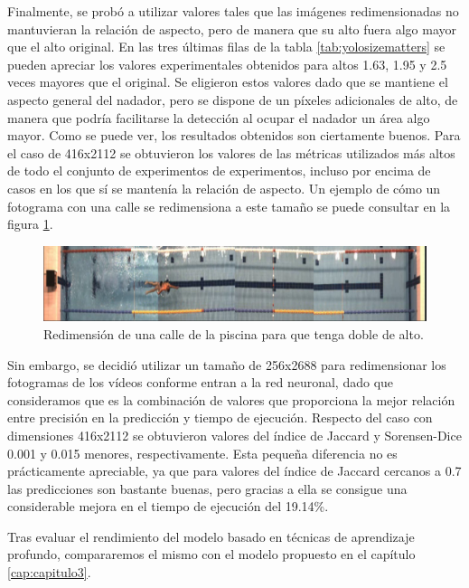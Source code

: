 Finalmente, se probó a utilizar valores tales que las imágenes redimensionadas no mantuvieran la relación de aspecto, pero de manera que su alto fuera algo mayor que el alto original. En las tres últimas filas de la tabla \ref{tab:yolosizematters} se pueden apreciar los valores experimentales obtenidos para altos 1.63, 1.95 y 2.5 veces mayores que el original. Se eligieron estos valores dado que se mantiene el aspecto general del nadador, pero se dispone de un píxeles adicionales de alto, de manera que podría facilitarse la detección al ocupar el nadador un área algo mayor. Como se puede ver, los resultados obtenidos son ciertamente buenos. Para el caso de 416x2112 se obtuvieron los valores de las métricas utilizados más altos de todo el conjunto de experimentos de experimentos, incluso por encima de casos en los que sí se mantenía la relación de aspecto. Un ejemplo de cómo un fotograma con una calle se redimensiona a este tamaño se puede consultar en la figura \ref{fig:ejemplredimensiondoblealto}.

\begin{figure}
    \centering
    \includegraphics[width=\textwidth,height=\textheight,keepaspectratio]{imagenes/parte_IA/416x2112_YOLO_resize.png}
    \caption{Redimensión de una calle de la piscina para que tenga doble de alto.}
    \label{fig:ejemplredimensiondoblealto}
\end{figure}

Sin embargo, se decidió utilizar un tamaño de 256x2688 para redimensionar los fotogramas de los vídeos conforme entran a la red neuronal, dado que consideramos que es la combinación de valores que proporciona la mejor relación entre precisión en la predicción y tiempo de ejecución. Respecto del caso con dimensiones 416x2112 se obtuvieron valores del índice de Jaccard y Sorensen-Dice 0.001 y 0.015 menores, respectivamente. Esta pequeña diferencia no es prácticamente apreciable, ya que para valores del índice de Jaccard cercanos a 0.7 las predicciones son bastante buenas, pero gracias a ella se consigue una considerable mejora en el tiempo de ejecución del 19.14\%.

Tras evaluar el rendimiento del modelo basado en técnicas de aprendizaje profundo, compararemos el mismo con el modelo propuesto en el capítulo \ref{cap:capitulo3}. 

